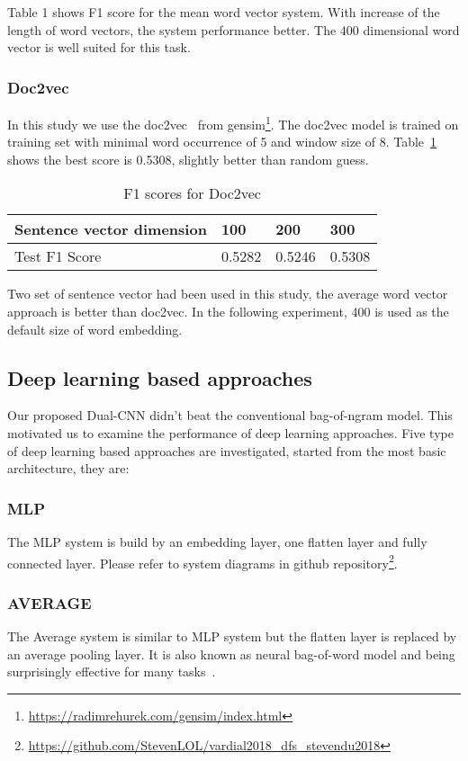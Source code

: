 \documentclass[11pt]{article}
\begin{document}
Table 1 shows F1 score for the mean word vector system. With increase of the length of word vectors, the system performance better. The 400 dimensional word vector is well suited for this task\label{vectorsize}.


\subsubsection{Doc2vec}

In this study we use the doc2vec~\cite{Le2014Distributed} from gensim\footnote{\url{https://radimrehurek.com/gensim/index.html}}. The doc2vec model is trained on training set with minimal word occurrence of 5 and window size of 8. Table~\ref{doc2vec} shows the best score is 0.5308, slightly better than random guess.


\begin{table}[h]
	\centering
	
	
	\begin{tabular}{|l|l|l|l|}
		\hline
		Sentence vector dimension & 100 & 200 & 300 \\ \hline
		Test F1 Score & 0.5282 & 0.5246 & 0.5308 \\ \hline
	\end{tabular}
	\caption{F1 scores for Doc2vec}
	\label{doc2vec}
\end{table}




Two set of sentence vector had been used in this study, the average word vector approach is better than doc2vec. In the following experiment, 400 is used as the default size of word embedding.


\subsection{Deep learning based approaches}

Our proposed Dual-CNN didn't beat the conventional bag-of-ngram model. This motivated us to examine the performance of deep learning approaches. Five type of deep learning based approaches are investigated, started from the most basic architecture, they are:
\subsubsection{MLP}
The MLP system is build by an embedding layer, one flatten layer and fully connected layer. Please refer to system diagrams in github repository\footnote{\url{https://github.com/StevenLOL/vardial2018_dfs_stevendu2018}}. 
\subsubsection{AVERAGE }
The Average system is similar to MLP system but the flatten layer is replaced by an average pooling layer. It is also known as neural bag-of-word model and being surprisingly effective for many tasks~\cite{Iyyer2015Deep}. 
\end{document}
